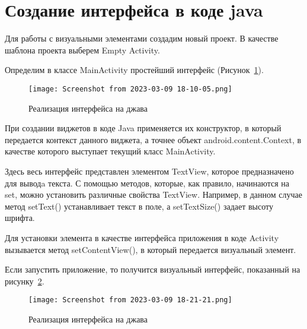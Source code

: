 \section{Создание интерфейса в коде java}
Для работы с визуальными элементами создадим новый проект. В качестве
шаблона проекта выберем Empty Activity.\par
Определим в классе MainActivity простейший интерфейс
(Рисунок~\ref{fig:activity:layout:java}).

\begin{figure}[h!tp]
	\centering
	\texttt{[image: Screenshot from 2023-03-09 18-10-05.png]}
	\caption{Реализация интерфейса на джава}
	\label{fig:activity:layout:java}
\end{figure}

При создании виджетов в коде Java применяется их конструктор, в который
передается контекст данного виджета, а точнее объект
android.content.Context, в качестве которого выступает текущий класс
MainActivity.\par
Здесь весь интерфейс представлен элементом TextView, которое
предназначено для выводa текста. С помощью методов, которые, как
правило, начинаются на set, можно установить различные свойства TextView.
Например, в данном случае метод setText() устанавливает текст в поле, а
setTextSize() задает высоту шрифта.\par
Для установки элемента в качестве интерфейса приложения в коде Activity
вызывается метод setContentView(), в который передается визуальный
элемент.\par
Если запустить приложение, то получится визуальный интерфейс, показанный
на рисунку~\ref{fig:view:textview:java}.

\begin{figure}[h!tp]
	\centering
	\texttt{[image: Screenshot from 2023-03-09 18-21-21.png]}
	\caption{Реализация интерфейса на джава}
	\label{fig:view:textview:java}
\end{figure}

